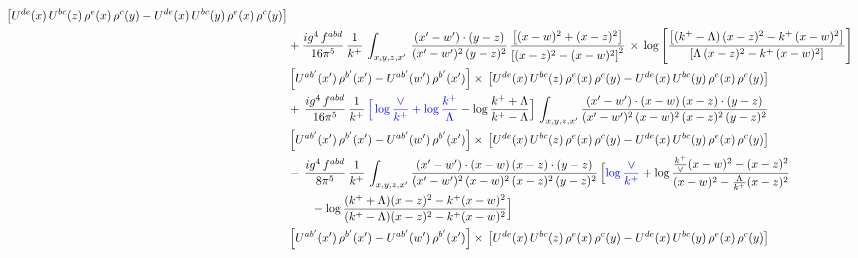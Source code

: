\documentclass[9pt]{article}
\numberwithin{equation}{section}
\begin{document}
\begin{align}
\left[U^{de}(x)\,U^{bc}(z)\, \rho^{e}(x)\,\rho^{c}(y)-U^{de}(x)\,U^{bc}(y)\,\rho^{e}(x)\,\rho^{c}(y)\right]\notag \\ & +\frac{ig^{4}\,f^{abd}}{16\pi^{5}}\, \frac{1}{k^{+}}\,\int_{x,y,z,x'}\, \frac{(x'-w')\cdot (y-z)}{(x'-w')^{2}\,(y-z)^{2}}\, \frac{\left[(x-w)^{2}+(x-z)^{2}\right]}{\left[(x-z)^{2}-(x-w)^{2}\right]^{2}}\, \times\, \log{\left[\frac{\left[(k^{+}-\Lambda)\, (x-z)^{2} - k^{+}\, (x-w)^{2}\right]}{\left[\Lambda\, (x-z)^{2} - k^{+}\, (x-w)^{2}\right]}\right]}\notag \\ & \left[U^{ab'}(x')\,\rho^{b'}(x')-U^{ab'}(w')\, \rho^{b'}(x')\right]\times\, \left[U^{de}(x)\,U^{bc}(z)\, \rho^{e}(x)\,\rho^{c}(y)-U^{de}(x)\,U^{bc}(y)\,\rho^{e}(x)\,\rho^{c}(y)\right]\notag \\ & +\, \frac{ig^{4}\,f^{abd}}{16\pi^{5}}\,\frac{1}{k^{+}}\,{\color{blue}\Big[\log\frac{\vee}{k^{+}}+\log\frac{k^{+}}{\Lambda}}-\log\frac{k^{+}+\Lambda}{k^{+}-\Lambda}\Big]\,\int_{x,y,z,x'} \frac{(x'-w')\cdot (x-w)\, (x-z)\cdot (y-z)}{(x'-w')^{2}\, (x-w)^{2}\, (x-z)^{2}\, (y-z)^{2}}\, \notag \\ & \left[U^{ab'}(x')\,\rho^{b'}(x')-U^{ab'}(w')\, \rho^{b'}(x')\right]\times\, \left[U^{de}(x)\,U^{bc}(z)\, \rho^{e}(x)\,\rho^{c}(y)-U^{de}(x)\,U^{bc}(y)\,\rho^{e}(x)\,\rho^{c}(y)\right]\notag \\ &-\, \frac{ig^{4}\,f^{abd}}{8\pi^{5}}\,\frac{1}{k^{+}}\,\int_{x,y,z,x'}\frac{(x'-w')\cdot (x-w)\, (x-z)\cdot (y-z)}{(x'-w')^{2}\, (x-w)^{2}\, (x-z)^{2}\, (y-z)^{2}}\,\Big[{\color{blue}\log\frac{\vee}{k^{+}}}+\log\frac{\frac{k^{+}}{\vee}(x-w)^{2}-(x-z)^{2}}{(x-w)^{2}-\frac{\Lambda}{k^{+}}(x-z)^{2}}\notag \\ & \qquad-\log\frac{(k^{+}+\Lambda)(x-z)^{2}-k^{+}(x-w)^{2}}{(k^{+}-\Lambda)(x-z)^{2}-k^{+}(x-w)^{2}}\Big] \notag \\ & \left[U^{ab'}(x')\,\rho^{b'}(x')-U^{ab'}(w')\, \rho^{b'}(x')\right]\times\, \left[U^{de}(x)\,U^{bc}(z)\, \rho^{e}(x)\,\rho^{c}(y)-U^{de}(x)\,U^{bc}(y)\,\rho^{e}(x)\,\rho^{c}(y)\right]
\end{align}
\end{document}
